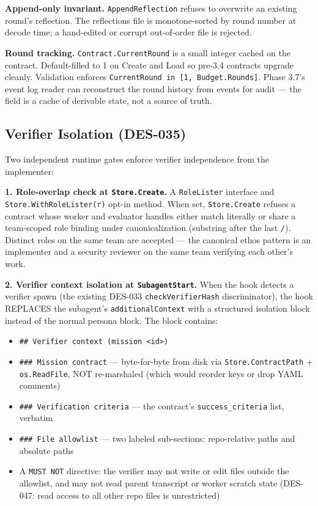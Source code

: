 \documentclass[a4paper,10pt]{article}
\newcommand{\field}[1]{\texttt{#1}}
\begin{document}
\textbf{Append-only invariant.}  \texttt{AppendReflection} refuses
to overwrite an existing round's reflection.  The reflections file
is monotone-sorted by round number at decode time; a hand-edited or
corrupt out-of-order file is rejected.

\textbf{Round tracking.}  \field{Contract.CurrentRound} is a small
integer cached on the contract.  Default-filled to 1 on Create and
Load so pre-3.4 contracts upgrade cleanly.  Validation enforces
\texttt{CurrentRound in [1, Budget.Rounds]}.  Phase 3.7's event log
reader can reconstruct the round history from events for audit ---
the field is a cache of derivable state, not a source of truth.

\subsection{Verifier Isolation (DES-035)}

Two independent runtime gates enforce verifier independence from the
implementer:

\textbf{1. Role-overlap check at \texttt{Store.Create}.}  A
\texttt{RoleLister} interface and \texttt{Store.WithRoleLister(r)}
opt-in method.  When set, \texttt{Store.Create} refuses a contract
whose worker and evaluator handles either match literally or share
a team-scoped role binding under canonicalization (substring after
the last \texttt{/}).  Distinct roles on the same team are accepted
--- the canonical ethos pattern is an implementer and a security
reviewer on the same team verifying each other's work.

\textbf{2. Verifier context isolation at \texttt{SubagentStart}.}
When the hook detects a verifier spawn (the existing DES-033
\texttt{checkVerifierHash} discriminator), the hook REPLACES the
subagent's \texttt{additionalContext} with a structured isolation
block instead of the normal persona block.  The block contains:

\begin{itemize}
  \item \texttt{\#\# Verifier context (mission <id>)}
  \item \texttt{\#\#\# Mission contract} --- byte-for-byte from disk
    via \texttt{Store.ContractPath} + \texttt{os.ReadFile}, NOT
    re-marshaled (which would reorder keys or drop YAML comments)
  \item \texttt{\#\#\# Verification criteria} --- the contract's
    \field{success\_criteria} list, verbatim
  \item \texttt{\#\#\# File allowlist} --- two labeled sub-sections:
    repo-relative paths and absolute paths
  \item A \texttt{MUST NOT} directive: the verifier may not write or
    edit files outside the allowlist, and may not read parent
    transcript or worker scratch state (DES-047: read access to all
    other repo files is unrestricted)
\end{itemize}
\end{document}
